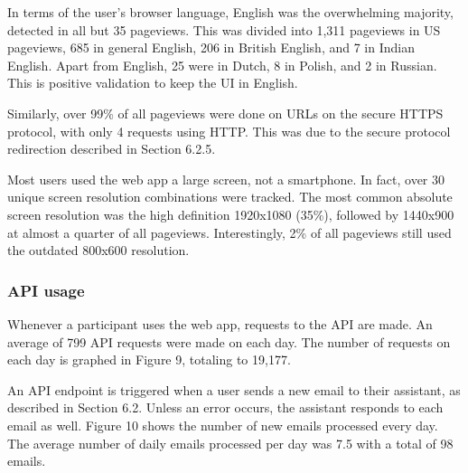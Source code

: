 \documentclass{article}
\begin{document}
In terms of the user's browser language, English was the overwhelming majority, detected in all but 35 pageviews. This was divided into 1,311 pageviews in US pageviews, 685 in general English, 206 in British English, and 7 in Indian English. Apart from English, 25 were in Dutch, 8 in Polish, and 2 in Russian. This is positive validation to keep the UI in English.

Similarly, over 99\% of all pageviews were done on URLs on the secure HTTPS protocol, with only 4 requests using HTTP. This was due to the secure protocol redirection described in Section 6.2.5.

Most users used the web app a large screen, not a smartphone. In fact, over 30 unique screen resolution combinations were tracked. The most common absolute screen resolution was the high definition 1920x1080 (35\%), followed by 1440x900 at almost a quarter of all pageviews. Interestingly, 2\% of all pageviews still used the outdated 800x600 resolution.

\subsubsection{API usage}

Whenever a participant uses the web app, requests to the API are made. An average of 799 API requests were made on each day. The number of requests on each day is graphed in Figure 9, totaling to 19,177.

An API endpoint is triggered when a user sends a new email to their assistant, as described in Section 6.2. Unless an error occurs, the assistant responds to each email as well. Figure 10 shows the number of new emails processed every day. The average number of daily emails processed per day was 7.5 with a total of 98 emails.
\end{document}
